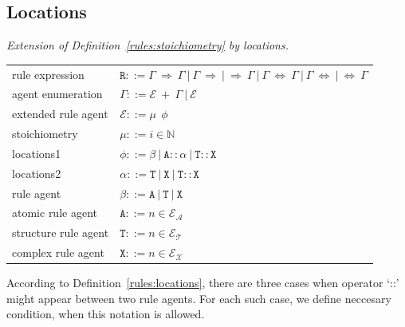 \documentclass{elsarticle}
\begin{document}
\subsection{Locations}

\begin{definition}\label{rules:locations}
\emph{Extension of Definition~\ref{rules:stoichiometry} by locations.}

\begin{center}
{\small
\hspace*{-1cm}\begin{tabular}{ l l }
 rule expression & $\mathtt{R} ::= \Gamma ~\Rightarrow~ \Gamma ~|~ \Gamma ~\Rightarrow ~|~ \Rightarrow~ \Gamma ~|~ \Gamma ~\Leftrightarrow~ \Gamma ~|~ \Gamma ~\Leftrightarrow ~|~ \Leftrightarrow~ \Gamma $\\
 agent enumeration & $\Gamma ::= \mathcal{E}~ +~\Gamma ~|~ \mathcal{E}$\\
 extended rule agent & $\mathcal{E} ::= \mu ~~ \phi$\\
 stoichiometry & $\mu ::= i \in \mathbb{N}$\\
 locations1 & $\phi ::= \beta ~|~ \mathtt{A} :: \alpha ~|~ \mathtt{T}::\mathtt{X}$\\
 locations2 & $\alpha ::= \mathtt{T} ~|~ \mathtt{X} ~|~ \mathtt{T} :: \mathtt{X}$\\
 rule agent & $\beta ::= \mathtt{A} ~|~ \mathtt{T} ~|~ \mathtt{X}$\\
 atomic rule agent & $\mathtt{A} ::= n \in \mathcal{E}_\mathcal{A}$\\
 structure rule agent & $\mathtt{T} ::= n \in \mathcal{E}_\mathcal{T}$\\
 complex rule agent & $\mathtt{X} ::= n \in \mathcal{E}_\mathcal{X}$\\
\end{tabular}
}
\end{center}
\end{definition}

According to Definition~\ref{rules:locations}, there are three cases when operator `::' might appear between two rule agents. For each such case, we define neccesary condition, when this notation is allowed.
\end{document}

